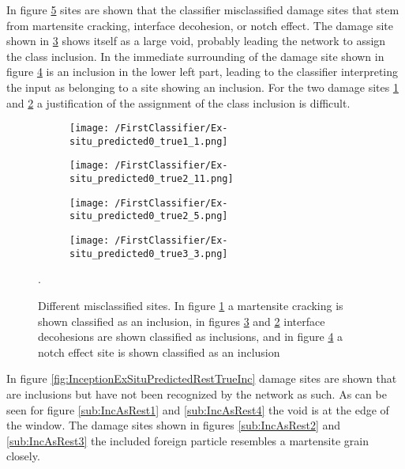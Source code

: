 In figure \ref{fig:InceptionExSituPredictedIncTrueRest} sites are shown that the classifier misclassified damage sites that stem from martensite cracking, interface decohesion, or notch effect. The damage site shown in \ref{sub:IDasInc1} shows itself as a large void, probably leading the network to assign the class inclusion. In the immediate surrounding of the damage site shown in figure \ref{sub:NasInc} is an inclusion in the lower left part, leading to the classifier interpreting the input as belonging to a site showing an inclusion. For the two damage sites \ref{sub:MasInc} and \ref{sub:IDasInc2} a justification of the assignment of the class inclusion is difficult. \\


\begin{figure}
\centering
\begin{subfigure}{.24\textwidth}
\texttt{[image: /FirstClassifier/Ex-situ\_predicted0\_true1\_1.png]}
\caption{}
\label{sub:MasInc}
\end{subfigure}
\centering
\begin{subfigure}{.24\textwidth}
\texttt{[image: /FirstClassifier/Ex-situ\_predicted0\_true2\_11.png]}
\caption{}
\label{sub:IDasInc2}
\end{subfigure}
\centering
\begin{subfigure}{.24\textwidth}
\texttt{[image: /FirstClassifier/Ex-situ\_predicted0\_true2\_5.png]}
\caption{}
\label{sub:IDasInc1}
\end{subfigure}
\centering
\begin{subfigure}{.24\textwidth}
\texttt{[image: /FirstClassifier/Ex-situ\_predicted0\_true3\_3.png]}
\caption{}
\label{sub:NasInc}
\end{subfigure}
\caption{Different misclassified sites. In figure \ref{sub:MasInc} a martensite cracking is shown classified as an inclusion, in figures \ref{sub:IDasInc1} and \ref{sub:IDasInc2} interface decohesions are shown classified as inclusions, and in figure \ref{sub:NasInc} a notch effect site is shown classified as an inclusion}. \\
\label{fig:InceptionExSituPredictedIncTrueRest}
\end{figure}

In figure \ref{fig:InceptionExSituPredictedRestTrueInc} damage sites are shown that are inclusions but have not been recognized by the network as such. As can be seen for figure \ref{sub:IncAsRest1} and \ref{sub:IncAsRest4} the void is at the edge of the window. The damage sites shown in figures \ref{sub:IncAsRest2} and \ref{sub:IncAsRest3} the included foreign particle resembles a martensite grain closely. \\

